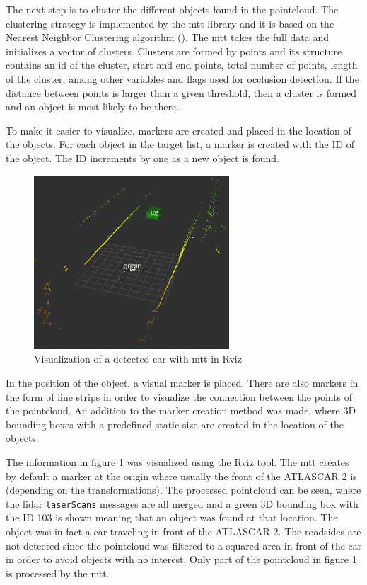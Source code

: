The next step is to cluster the different objects found in the pointcloud. The clustering strategy is implemented by the \gls{mtt} library and it is based on the Nearest Neighbor Clustering algorithm (\cite{Yu2018}). The \gls{mtt} takes the full data and initializes a vector of clusters. Clusters are formed by points and its structure contains an id of the cluster, start and end points, total number of points, length of the cluster, among other variables and flags used for occlusion detection. If the distance between points is larger than a given threshold, then a cluster is formed and an object is most likely to be there.

To make it easier to visualize, markers are created and placed in the location of the objects. For each object in the target list, a marker is created with the ID of the object. The ID increments by one as a new object is found. 

\begin{figure}[htp]
	
	\centering
	\includegraphics[width=0.65\textwidth]{caplabel/imgs/rviz1.png}
	
	\caption{Visualization of a detected car with \gls{mtt} in Rviz}
	\label{fig:rviz1}
	
\end{figure}

In the position of the object, a visual marker is placed. There are also markers in the form of line strips in order to visualize the connection between the points of the pointcloud. An addition to the marker creation method was made, where 3D bounding boxes with a predefined static size are created in the location of the objects.

The information in figure \ref{fig:rviz1} was visualized using the Rviz tool. The \gls{mtt} creates by default a marker at the origin where usually the front of the ATLASCAR 2 is (depending on the transformations). The processed pointcloud can be seen, where the \gls{lidar} \texttt{laserScans} messages are all merged and a green 3D bounding box with the ID 103 is shown meaning that an object was found at that location. The object was in fact a car traveling in front of the ATLASCAR 2. The roadsides are not detected since the pointcloud was filtered to a squared area in front of the car in order to avoid objects with no interest. Only part of the pointcloud in figure \ref{fig:rviz1} is processed by the \gls{mtt}.

